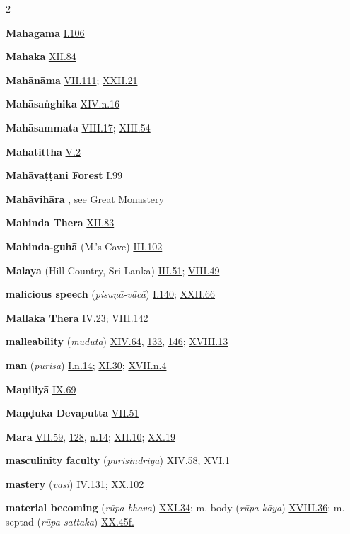 \begin{multicols}{2}
\begin{vismHanging}
\par\textbf{Mahāgāma} \hyperlink{I.106}{I.106}{}
\par\textbf{Mahaka} \hyperlink{XII.84}{XII.84}{}
\par\textbf{Mahānāma} \hyperlink{VII.111}{VII.111}{}; \hyperlink{XXII.21}{XXII.21}{}
\par\textbf{Mahāsaṅghika} \hyperlink{XIV.n16}{XIV.n.16}{}
\par\textbf{Mahāsammata} \hyperlink{VIII.17}{VIII.17}{}; \hyperlink{XIII.54}{XIII.54}{}
\par\textbf{Mahātittha} \hyperlink{V.2}{V.2}{}
\par\textbf{Mahāvaṭṭani Forest} \hyperlink{I.99}{I.99}{}
\par\textbf{Mahāvihāra} , see Great Monastery
\par\textbf{Mahinda Thera} \hyperlink{XII.83}{XII.83}{}
\par\textbf{Mahinda-guhā} (M.’s Cave) \hyperlink{III.102}{III.102}{}
\par\textbf{Malaya} (Hill Country, Sri Lanka) \hyperlink{III.51}{III.51}{}; \hyperlink{VIII.49}{VIII.49}{}
\par\textbf{malicious speech} (\emph{pisuṇā-vācā}) \hyperlink{I.140}{I.140}{}; \hyperlink{XXII.66}{XXII.66}{}
\par\textbf{Mallaka Thera} \hyperlink{IV.23}{IV.23}{}; \hyperlink{VIII.142}{VIII.142}{}
\par\textbf{malleability} (\emph{mudutā}) \hyperlink{XIV.64}{XIV.64}{}, \hyperlink{XIV.133}{133}{}, \hyperlink{XIV.146}{146}{}; \hyperlink{XVIII.13}{XVIII.13}{}
\par\textbf{man} (\emph{purisa}) \hyperlink{I.n14}{I.n.14}{}; \hyperlink{XI.30}{XI.30}{}; \hyperlink{XVII.n4}{XVII.n.4}{}
\par\textbf{Maṇiliyā} \hyperlink{IX.69}{IX.69}{}
\par\textbf{Maṇḍuka Devaputta} \hyperlink{VII.51}{VII.51}{}
\par\textbf{Māra} \hyperlink{VII.59}{VII.59}{}, \hyperlink{VII.128}{128}{}, \hyperlink{VII.n14}{n.14}{}; \hyperlink{XII.10}{XII.10}{}; \hyperlink{XX.19}{XX.19}{}
\par\textbf{masculinity faculty} (\emph{purisindriya}) \hyperlink{XIV.58}{XIV.58}{}; \hyperlink{XVI.1}{XVI.1}{}
\par\textbf{mastery} (\emph{vasi}) \hyperlink{IV.131}{IV.131}{}; \hyperlink{XX.102}{XX.102}{}
\par\textbf{material becoming} (\emph{rūpa-bhava}) \hyperlink{XXI.34}{XXI.34}{}; m. body (\emph{rūpa-kāya}) \hyperlink{XVIII.36}{XVIII.36}{}; m. septad (\emph{rūpa-sattaka}) \hyperlink{XX.45}{XX.45f.}{}

\end{vismHanging}
\end{multicols}
